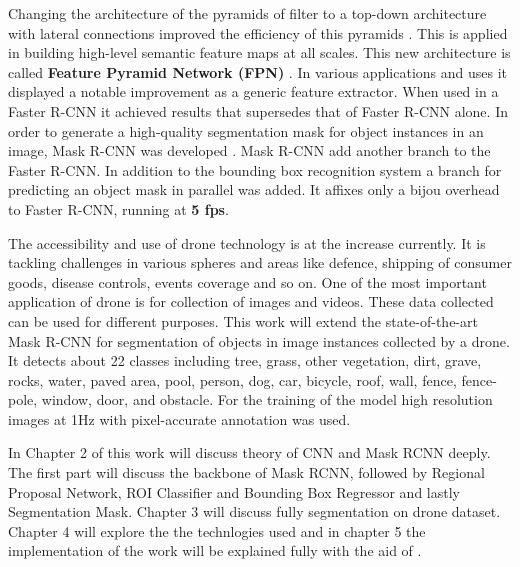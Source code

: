 Changing the architecture of the pyramids of filter to a top-down architecture with lateral connections improved the efficiency of this pyramids \protect\cite{K}. This is applied in building high-level semantic feature maps at all scales. This new architecture is called \textbf{ Feature Pyramid Network (FPN)} \protect\cite{K} . In various applications and uses it displayed a notable improvement as a generic feature extractor. When used in a Faster R-CNN it achieved results that supersedes that of Faster R-CNN alone. In order to generate a high-quality segmentation mask for object instances in an image, Mask R-CNN was developed \protect\cite{L}. Mask R-CNN add another branch to the Faster R-CNN. In addition to the bounding box recognition system a branch for predicting an object mask in parallel was added. It affixes only a bijou overhead to Faster R-CNN, running at \textbf{ 5 fps}.

The accessibility and use of drone technology is at the increase currently. It is tackling challenges in various spheres and areas like defence, shipping of consumer goods, disease controls, events coverage and so on. One of the most important application of drone is for collection of images and videos. These data collected can be used for different purposes. This work will extend the state-of-the-art Mask R-CNN for segmentation of objects in image instances collected by a drone. It detects about 22 classes including tree, grass, other vegetation, dirt, grave, rocks, water, paved area, pool, person, dog, car, bicycle, roof, wall, fence, fence-pole, window, door, and obstacle. For the training of the model high resolution images at 1Hz with pixel-accurate annotation was used.

In Chapter 2 of this work will discuss theory of CNN and Mask RCNN deeply. The first part will discuss the backbone of Mask RCNN, followed by Regional Proposal Network, ROI Classifier and Bounding Box Regressor and lastly Segmentation Mask.
Chapter 3 will discuss fully segmentation on drone dataset. Chapter 4 will explore the the technlogies used and in chapter 5 the implementation of the work will be explained fully with the aid of \protect\cite{Y}.


